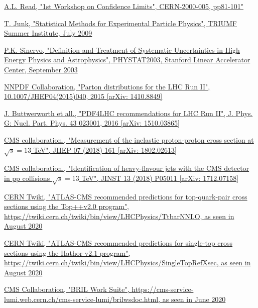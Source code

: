 \documentclass[a4paper, 10pt, openright]{report}
\begin{document}
\begin{thebibliography}{1}
\href{https://cds.cern.ch/record/411537/files/CERN-2000-005.pdf}{A.L. Read,
"1st Workshop on Confidence Limits", CERN-2000-005, pp81-101"}

\href{https://www-cdf.fnal.gov/~trj/tsi09/trjtsi_Day1.pdf}{T. Junk,
"Statistical Methods for Experimental Particle Physics", TRIUMF Summer Institute, July 2009}

\href{https://hep.physics.utoronto.ca/~pekka/papers/systematicsreview.pdf}{P.K. Sinervo,
"Definition and Treatment of Systematic Uncertainties in High Energy Physics and Astrophysics", PHYSTAT2003, Stanford Linear Accelerator Center, September 2003}

\href{https://arxiv.org/abs/1410.8849}{NNPDF Collaboration,
"Parton distributions for the LHC Run II", 10.1007/JHEP04(2015)040, 2015 [arXiv: 1410.8849]}

\href{https://arxiv.org/abs/1510.03865}{J. Buttwerworth et all.,
"PDF4LHC recommendations for LHC Run II", J. Phys. G: Nucl. Part. Phys. 43 023001, 2016 [arXiv: 1510.03865]}

\href{https://arxiv.org/abs/1802.02613}{CMS collaboration.,
"Measurement of the inelastic proton-proton cross section at $\sqrt{s} = 13$ TeV", 	JHEP 07 (2018) 161 [arXiv: 1802.02613]}

\href{https://arxiv.org/abs/1712.07158}{CMS collaboration.,
"Identification of heavy-flavour jets with the CMS detector in pp collisions $\sqrt{s} = 13$ TeV", 		JINST 13 (2018) P05011 [arXiv: 1712.07158]}

\href{https://twiki.cern.ch/twiki/bin/view/LHCPhysics/TtbarNNLO}{CERN Twiki,
"ATLAS-CMS recommended predictions for top-quark-pair cross sections using the Top++v2.0 program", \url{https://twiki.cern.ch/twiki/bin/view/LHCPhysics/TtbarNNLO}, as seen in August 2020}

\href{https://twiki.cern.ch/twiki/bin/view/LHCPhysics/SingleTopRefXsec}{CERN Twiki, 
"ATLAS-CMS recommended predictions for single-top cross sections using the Hathor v2.1 program",
\url{https://twiki.cern.ch/twiki/bin/view/LHCPhysics/SingleTopRefXsec}, as seen in August 2020}


\href{https://cms-service-lumi.web.cern.ch/cms-service-lumi/brilwsdoc.html}{CMS Collaboration,
"BRIL Work Suite", \url{https://cms-service-lumi.web.cern.ch/cms-service-lumi/brilwsdoc.html}, as seen in June 2020}

\end{thebibliography}
\end{document}
